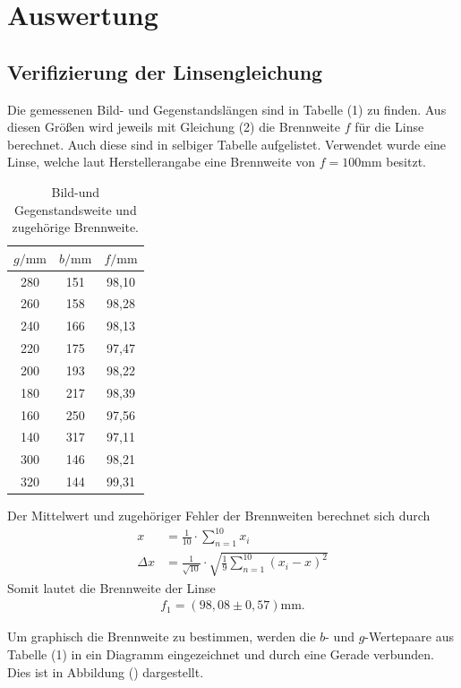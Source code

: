 \section{Auswertung}
\label{sec:Auswertung}

\subsection{Verifizierung der Linsengleichung}
Die gemessenen Bild- und Gegenstandslängen sind in Tabelle (1) zu finden. Aus diesen Größen wird jeweils mit Gleichung (2) 
die Brennweite $f$ für  die Linse berechnet. Auch diese sind in selbiger Tabelle aufgelistet.
Verwendet wurde eine Linse, welche laut Herstellerangabe eine Brennweite von $f = 100\si{\milli\meter}$ besitzt.
\begin{table}[H]
\centering
\caption{Bild-und Gegenstandsweite und zugehörige Brennweite.}
\label{tab:einzel1}
\begin{tabular}{c c c}
\toprule
$g/\si{\milli\meter}$ & $b/\si{\milli\meter}$ & $f/\si{\milli\meter}$\\
\midrule
280  &	151 & 98,10 \\ 
260  &	158 & 98,28 \\
240  &	166 & 98,13 \\
220  &	175 & 97,47 \\
200  &	193 & 98,22 \\
180  &	217 & 98,39 \\
160  &	250 & 97,56 \\
140  &	317 & 97,11 \\
300  &	146 & 98,21 \\
320  &	144 & 99,31 \\
\bottomrule
\end{tabular}
\end{table}

Der Mittelwert und zugehöriger Fehler der Brennweiten berechnet sich durch
\begin{align*}
x &= \frac{1}{10}\cdot \sum_{n=1}^{10} x_i\\
\Delta x &=\frac{1}{\sqrt{10}} \cdot \sqrt{\frac{1}{9} \sum_{n=1}^{10} (x_i - x)^2} 
\end{align*}
Somit lautet die Brennweite der Linse
\begin{align*}
f_1 = (98,08 \pm 0,57) \si{\milli\meter} .
\end{align*}

Um graphisch die Brennweite zu bestimmen, werden die $b$- und $g$-Wertepaare aus Tabelle (1) in ein Diagramm eingezeichnet und durch eine Gerade verbunden.
Dies ist in Abbildung () dargestellt.

